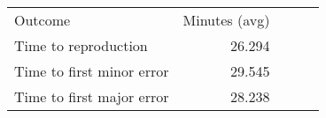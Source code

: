 \begin{tabular}{lrrrr}
\hline\hline
Outcome & Minutes (avg) \\
Time to reproduction & 26.294 \\
Time to first minor error & 29.545 \\
Time to first major error & 28.238 \\
\hline\hline
\end{tabular}
